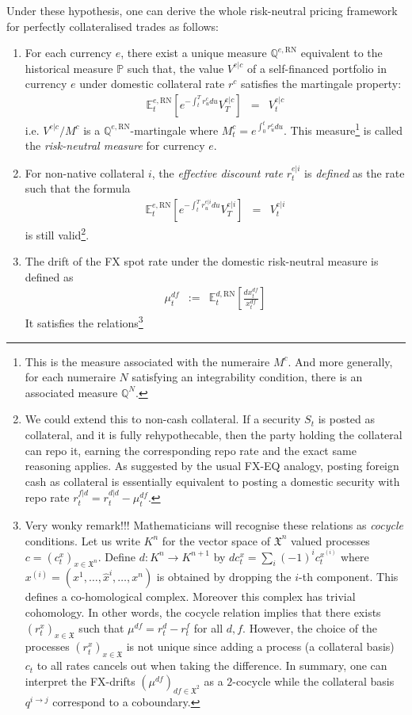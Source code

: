 \documentclass[11pt,english]{amsart}
\newcommand{\fr}{\mathfrak}
\newcommand{\RN}{\mathrm{RN}}
\newcommand{\EE}{\mathbb{E}}
\newcommand{\PP}{\mathbb{P}}
\newcommand{\QQ}{\mathbb{Q}}
\theoremstyle{definition}
\begin{document}
Under these hypothesis, one can derive the whole risk-neutral pricing framework for perfectly collateralised trades as follows: 
\begin{enumerate}%
\item For each currency $e$, there exist a unique measure $\QQ^{e,\RN}$ equivalent to the historical measure $\PP$ such that, the value $V^{e|c}$ of a self-financed portfolio in currency $e$ under domestic collateral rate $r^c$ satisfies the martingale property:
\begin{eqnarray}
	\EE^{e,\RN}_t\left[ e^{-\int_t^T r^c_u du} V^{e|c}_T \right] &=& V^{e|c}_t
\end{eqnarray} 
i.e. $V^{e|c}/M^{c}$ is a $\QQ^{e,\RN}$-martingale where $M^{c}_t = e^{\int_0^t r^c_u du}$. This measure\footnote{This is the measure associated with the numeraire $M^{c}$. And more generally, for each numeraire $N$ satisfying an integrability condition, there is an associated measure $\QQ^N$.} is called the \emph{risk-neutral measure} for currency $e$. 
\item For non-native collateral $i$, the \emph{effective discount rate} $r^{e|i}_t$ is \emph{defined} as the rate such that the formula
\begin{eqnarray}
	\EE^{e,\RN}_t\left[ e^{-\int_t^T r^{e|i}_u du} V^{e|i}_T \right] &=& V^{e|i}_t
\end{eqnarray} 
is still valid\footnote{We could extend this to non-cash collateral. If a security $S_t$ is posted as collateral, and  it is fully rehypothecable, then the party holding the collateral can repo it, earning the corresponding repo rate and the exact same reasoning applies. As suggested by the usual FX-EQ analogy, posting foreign cash as collateral is essentially equivalent to posting a domestic security with repo rate $r^{f|d}_t = r^{d|d}_t - \mu^{df}_t$.}. %
\item The drift of the FX spot rate under the domestic risk-neutral measure is defined as
\begin{eqnarray}
	\mu^{df}_t &:=& \EE^{d,\RN}_t\left[\tfrac{dx^{df}_t}{x^{df}_t}\right]
\end{eqnarray} 
It satisfies the relations\footnote{Very wonky remark!!! Mathematicians will recognise these relations as \emph{cocycle} conditions. Let us write $K^n$ for the vector space of  $\fr{X}^n$ valued processes $c = (c^x_t)_{x\in \fr{X}^n}$. Define $d: K^n \to K^{n+1}$ by $dc^{x}_t = \sum_i (-1)^i c^{x^{(i)}}_t$ where $x^{(i)} = (x^1,\ldots,\widehat{x}^i,\ldots,x^n)$ is obtained by dropping the $i$-th component. This defines a co-homological complex. Moreover this complex has trivial cohomology. In other words, the cocycle relation implies that there exists $(r^x_t)_{x\in \fr{X}}$ such that $\mu^{df} = r^d_t - r^f_t$ for all $d,f$. However, the choice of the processes $(r^x_t)_{x\in \fr{X}}$ is not unique since adding a process (a collateral basis) $c_t$ to all rates cancels out when taking the difference. In summary, one can interpret the FX-drifts $(\mu^{df})_{df\in \fr{X}^2}$ as a $2$-cocycle while the collateral basis $q^{i\to j}$ correspond to a coboundary.} 

\end{enumerate}
\end{document}
